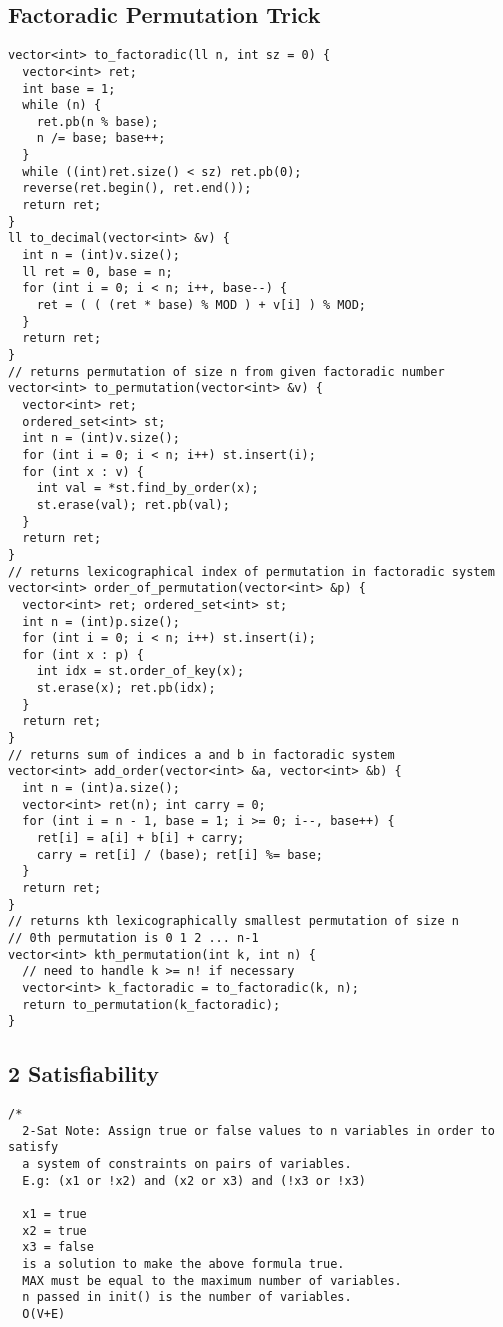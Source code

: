 \documentclass[10pt,a4paper,onesided]{article}
\begin{document}
\begin{multicols*}{3}
\subsection{Factoradic Permutation Trick}
\begin{lstlisting}
vector<int> to_factoradic(ll n, int sz = 0) {
  vector<int> ret;
  int base = 1;
  while (n) {
    ret.pb(n % base);
    n /= base; base++;
  }
  while ((int)ret.size() < sz) ret.pb(0);
  reverse(ret.begin(), ret.end());
  return ret;
}
ll to_decimal(vector<int> &v) {
  int n = (int)v.size();
  ll ret = 0, base = n;
  for (int i = 0; i < n; i++, base--) {
    ret = ( ( (ret * base) % MOD ) + v[i] ) % MOD;
  }
  return ret;
}
// returns permutation of size n from given factoradic number
vector<int> to_permutation(vector<int> &v) {
  vector<int> ret;
  ordered_set<int> st;
  int n = (int)v.size();
  for (int i = 0; i < n; i++) st.insert(i);
  for (int x : v) {
    int val = *st.find_by_order(x);
    st.erase(val); ret.pb(val);
  }
  return ret;
}
// returns lexicographical index of permutation in factoradic system
vector<int> order_of_permutation(vector<int> &p) {
  vector<int> ret; ordered_set<int> st;
  int n = (int)p.size();
  for (int i = 0; i < n; i++) st.insert(i);
  for (int x : p) {
    int idx = st.order_of_key(x);
    st.erase(x); ret.pb(idx);
  }
  return ret;
}
// returns sum of indices a and b in factoradic system
vector<int> add_order(vector<int> &a, vector<int> &b) {
  int n = (int)a.size();
  vector<int> ret(n); int carry = 0;
  for (int i = n - 1, base = 1; i >= 0; i--, base++) {
    ret[i] = a[i] + b[i] + carry;
    carry = ret[i] / (base); ret[i] %= base;
  }
  return ret;
}
// returns kth lexicographically smallest permutation of size n
// 0th permutation is 0 1 2 ... n-1
vector<int> kth_permutation(int k, int n) {
  // need to handle k >= n! if necessary
  vector<int> k_factoradic = to_factoradic(k, n);
  return to_permutation(k_factoradic);
} 
\end{lstlisting}
\subsection{2 Satisfiability}
\begin{lstlisting}
/*
  2-Sat Note: Assign true or false values to n variables in order to satisfy
  a system of constraints on pairs of variables.
  E.g: (x1 or !x2) and (x2 or x3) and (!x3 or !x3)

  x1 = true
  x2 = true
  x3 = false
  is a solution to make the above formula true.
  MAX must be equal to the maximum number of variables.
  n passed in init() is the number of variables.
  O(V+E)


\end{lstlisting}
\end{multicols*}
\end{document}
